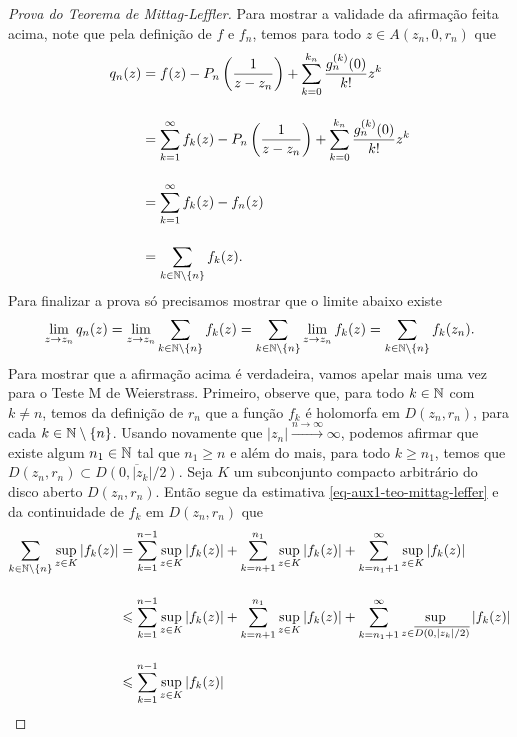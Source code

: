 \begin{proof}[Prova do Teorema de Mittag-Leffler]
    
    Para mostrar a validade da afirmação feita acima, 
    note que pela definição de $f$ e $f_n$, temos para todo
    $z\in A(z_n,0,r_n)$ que
    \begin{align*}
    q_n(z) 
    &= 
    f(z)- P_n\left(\frac{1}{z-z_n}\right) +
    \sum_{k=0}^{k_n} \frac{g_{n}^{(k)}(0)}{k!}z^k  
    \\[0.4cm]
    &=
    \sum_{k=1}^{\infty} f_k(z)
    - P_n\left(\frac{1}{z-z_n}\right) +
    \sum_{k=0}^{k_n} \frac{g_{n}^{(k)}(0)}{k!}z^k
    \\[0.4cm]
    &=
    \sum_{k=1}^{\infty} f_k(z) - f_n(z)
    \\[0.4cm]
    &=
    \sum_{k\in \mathbb{N}\setminus\{n\}} f_k(z).
    \end{align*}
    Para finalizar a prova só precisamos mostrar que o 
    limite abaixo existe
    \begin{equation}
    \label{eq-aux2-teo-mittag-leffer}
    \lim_{z\to z_n} q_n(z) 
    = 
    \lim_{z\to z_n} \sum_{k\in \mathbb{N}\setminus\{n\}} f_k(z)
    = 
    \sum_{k\in \mathbb{N}\setminus\{n\}} \lim_{z\to z_n} f_k(z)
    =
    \sum_{k\in \mathbb{N}\setminus\{n\}} f_k(z_n).
    \end{equation}    
    Para mostrar que a afirmação acima é verdadeira,
    vamos apelar mais uma vez para o Teste M de Weierstrass.
    Primeiro, observe que, para todo $k\in\mathbb{N}$ com $k\neq n$, temos
    da definição de $r_n$ que a função 
    $f_k$ é holomorfa em $D(z_n,r_n)$, 
    para cada $k\in\mathbb{N}\setminus\{n\}$. 
    Usando novamente que $|z_n|\xrightarrow{n\to\infty}\infty$,
    podemos afirmar que existe algum $n_1\in\mathbb{N}$
    tal que $n_1\geqslant n$  e além do mais, 
    para todo $k\geqslant n_1$, 
    temos que $D(z_n,r_n)\subset \overline{D(0,|z_k|/2)}$.
    Seja $K$ um subconjunto compacto arbitrário do disco aberto $D(z_n,r_n)$. 
    Então segue da estimativa 
    \eqref{eq-aux1-teo-mittag-leffer} e da continuidade de $f_k$ em
    $D(z_n,r_n)$ que 
    \begin{align*}
    \sum_{k\in \N\setminus\{n\}} \sup_{z\in K}|f_k(z)|
    &=
    \sum_{k=1}^{n-1}\sup_{z\in K}|f_k(z)|
    +
    \sum_{k=n+1}^{n_1}\sup_{z\in K}|f_k(z)|
    +
    \sum_{k=n_1+1}^{\infty}\sup_{z\in K}|f_k(z)|
    \\[0.4cm]
    &\leqslant
    \sum_{k=1}^{n-1}\sup_{z\in K}|f_k(z)|
    +
    \sum_{k=n+1}^{n_1}\sup_{z\in K}|f_k(z)|
    +
    \sum_{k=n_1+1}^{\infty}\sup_{z\in \overline{D(0,|z_k|/2)}}|f_k(z)|
    \\[0.4cm]
    &\leqslant
   \sum_{k=1}^{n-1}\sup_{z\in K}|f_k(z)|

\end{align*}
\end{proof}

